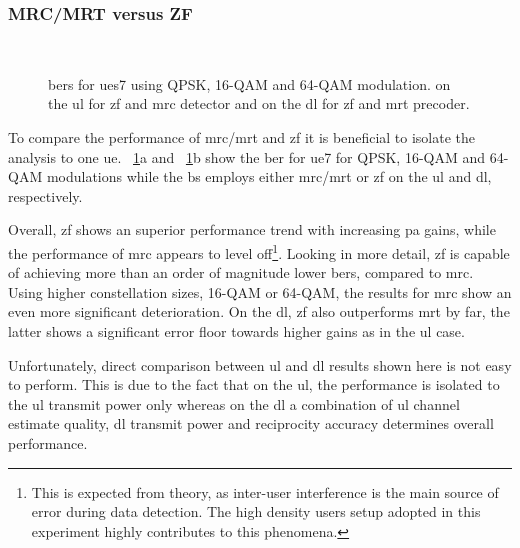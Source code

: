 \documentclass[journal]{IEEEtran}
\begin{document}
\subsubsection{MRC/MRT versus ZF}
\begin{figure}[!t]
	\centering
	\\
	\caption{\glspl{ber} for \glspl{ue}7 using QPSK, 16-QAM and 64-QAM modulation. \protect{} on the \gls{ul} for \gls{zf} and \gls{mrc} detector and \protect{} on the \gls{dl} for \gls{zf} and \gls{mrt} precoder.}
	\label{fig:MRC_vs_ZF}
\end{figure} 
%
%
%
%
%
%
To compare the performance of \gls{mrc}/\gls{mrt} and \gls{zf} it is beneficial to isolate the analysis to one \gls{ue}.
\figurename~\ref{fig:MRC_vs_ZF}a and  \figurename~\ref{fig:MRC_vs_ZF}b show the \gls{ber} for \gls{ue}7 for QPSK, 16-QAM and 64-QAM modulations while the \gls{bs} employs either \gls{mrc}/\gls{mrt} or \gls{zf} on the \gls{ul} and \gls{dl}, respectively.

Overall, \gls{zf} shows an superior performance trend with increasing \gls{pa} gains, while the performance of \gls{mrc} appears to level off\footnote{This is expected from theory, as inter-user interference is the main source of error during data detection. The high density users setup adopted in this experiment highly contributes to this phenomena.}.
Looking in more detail, \gls{zf} is capable of achieving more than an order of magnitude lower \glspl{ber}, compared to \gls{mrc}.
Using higher constellation sizes, 16-QAM or 64-QAM, the results for \gls{mrc} show an even more significant deterioration. 
On the \gls{dl}, \gls{zf} also outperforms \gls{mrt} by far, the latter shows a significant error floor towards higher gains as in the \gls{ul} case.

%

Unfortunately, direct comparison between \gls{ul} and \gls{dl} results shown here is not easy to perform.
%
This is due to the fact that on the \gls{ul}, the performance is isolated to the \gls{ul} transmit power only whereas on the \gls{dl} a combination of \gls{ul} channel estimate quality, \gls{dl} transmit power and reciprocity accuracy determines overall performance.
\end{document}
